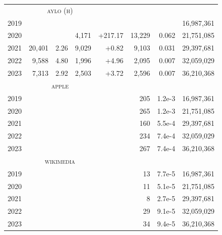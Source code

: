 \documentclass[nonacm,screen]{acmart}
\begin{document}
\begin{itemize}
\begin{table}
\begin{tabular}{r@{\hskip 1.5em}rrr r@{\hskip 1.5em}rrr}
& \multicolumn{3}{c}{\textsc{\MakeLowercase{Aylo (H)}}} & & & & \\ \cmidrule{2-4}
\color{lowlight} 2019 &             &        &           &          &            &        & \color{lowlight} 16,987,361 \\
\color{lowlight} 2020 &             &        &     4,171 &  +217.17 &     13,229 &  0.062 & \color{lowlight} 21,751,085 \\
\color{lowlight} 2021 &      20,401 &   2.26 &     9,029 &    +0.82 &      9,103 &  0.031 & \color{lowlight} 29,397,681 \\
\color{lowlight} 2022 &       9,588 &   4.80 &     1,996 &    +4.96 &      2,095 &  0.007 & \color{lowlight} 32,059,029 \\
\color{lowlight} 2023 &       7,313 &   2.92 &     2,503 &    +3.72 &      2,596 &  0.007 & \color{lowlight} 36,210,368 \\[2ex]

& \multicolumn{3}{c}{\textsc{\MakeLowercase{Apple}}} & & & & \\ \cmidrule{2-4}
\color{lowlight} 2019 &             &        &           &          &        205 & 1.2e-3 & \color{lowlight} 16,987,361 \\
\color{lowlight} 2020 &             &        &           &          &        265 & 1.2e-3 & \color{lowlight} 21,751,085 \\
\color{lowlight} 2021 &             &        &           &          &        160 & 5.5e-4 & \color{lowlight} 29,397,681 \\
\color{lowlight} 2022 &             &        &           &          &        234 & 7.4e-4 & \color{lowlight} 32,059,029 \\
\color{lowlight} 2023 &             &        &           &          &        267 & 7.4e-4 & \color{lowlight} 36,210,368 \\[2ex]

& \multicolumn{3}{c}{\textsc{\MakeLowercase{Wikimedia}}} & & & & \\ \cmidrule{2-4}
\color{lowlight} 2019 &             &        &           &          &         13 & 7.7e-5 & \color{lowlight} 16,987,361 \\
\color{lowlight} 2020 &             &        &           &          &         11 & 5.1e-5 & \color{lowlight} 21,751,085 \\
\color{lowlight} 2021 &             &        &           &          &          8 & 2.7e-5 & \color{lowlight} 29,397,681 \\
\color{lowlight} 2022 &             &        &           &          &         29 & 9.1e-5 & \color{lowlight} 32,059,029 \\
\color{lowlight} 2023 &             &        &           &          &         34 & 9.4e-5 & \color{lowlight} 36,210,368 \\


\end{tabular}
\end{table}
\end{itemize}
\end{document}
